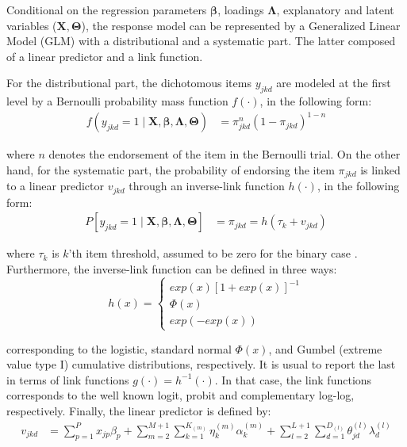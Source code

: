 Conditional on the regression parameters $\pmb{\beta}$, loadings $\pmb{\Lambda}$, explanatory and latent variables ($\mathbf{X},  \pmb{\Theta}$), the response model can be represented by a Generalized Linear Model (GLM) \cite{Nelder_et_al_1972, Nelder_et_al_1989} with a distributional and a systematic part. The latter composed of a linear predictor and a link function.

For the distributional part, the dichotomous items $y_{jkd}$ are modeled at the first level by a Bernoulli probability mass function $f(\cdot)$, in the following form:
%
\begin{equation} \label{eq:distributional}
	\begin{split}
		f \left( y_{jkd}=1 \; | \; \mathbf{X}, \pmb{\beta}, \pmb{\Lambda}, \pmb{\Theta} \right) &= \pi_{jkd}^{n} (1 - \pi_{jkd})^{1-n}
	\end{split}
\end{equation}

\noindent where $n$ denotes the endorsement of the item in the Bernoulli trial. On the other hand, for the systematic part, the probability of endorsing the item $\pi_{jkd}$ is linked to a linear predictor $v_{jkd}$ through an inverse-link function $h(\cdot)$, in the following form:
%
\begin{equation} \label{eq:systematic}
	\begin{split}
		P\left[ y_{jkd}=1 \; | \; \mathbf{X}, \pmb{\beta}, \pmb{\Lambda}, \pmb{\Theta} \right] &= \pi_{jkd} = h( \tau_{k} + v_{jkd} )
	\end{split}	
\end{equation}

\noindent where $\tau_{k}$ is $k$'th item threshold, assumed to be zero for the binary case \cite{Rabe_et_al_2004a}. Furthermore, the inverse-link function can be defined in three ways:
%
\begin{equation} \label{eq:response_dich1}
	h(x) = 
	\begin{cases}
		exp(x)[1 + exp(x)]^{-1} \\
		\Phi(x)  \\
		exp(-exp(x))
	\end{cases}
\end{equation}

\noindent corresponding to the logistic, standard normal $\Phi(x)$, and Gumbel (extreme value type I) cumulative distributions, respectively. It is usual to report the last in terms of link functions $g(\cdot) = h^{-1}(\cdot)$. In that case, the link functions corresponds to the well known logit, probit and complementary log-log, respectively. Finally, the linear predictor is defined by:
%
\begin{equation} \label{eq:linear_predictor1}
	\begin{split}
		v_{jkd} &= \sum_{p=1}^{P} x_{jp} \beta_{p} + \sum_{m=2}^{M+1} \sum_{k=1}^{K_{(m)}} \eta_{k}^{(m)} \alpha_{k}^{(m)} + \sum_{l=2}^{L+1} \sum_{d=1}^{D_{(l)}} \theta_{jd}^{(l)} \lambda_{d}^{(l)}
	\end{split}
\end{equation}

